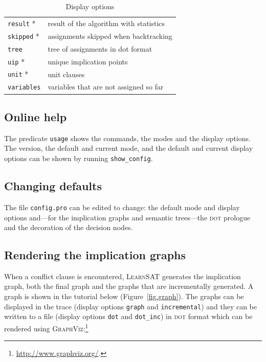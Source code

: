 \documentclass[11pt]{report}
\newcommand*{\p}[1]{\textup{\texttt{#1}}}
\newcommand*{\ls}{\textsc{LearnSAT}}
\newcommand*{\dt}{\textsc{dot}}
\begin{document}
\begin{table}[tbp]
\begin{center}
\begin{tabular}{|l|l|}
\p{result} *   &  result of the algorithm with statistics    \\
\p{skipped} *  &  assignments skipped when backtracking      \\
\p{tree}       &  tree of assignments in dot format\\
\p{uip} *       &  unique implication points                  \\
\p{unit} *     &  unit clauses                               \\
\p{variables} &  variables that are not assigned so far     \\
\hline
\end{tabular}
\end{center}
\caption{Display options}\label{tab.display}
\end{table}

\subsection{Online help}

The predicate \p{usage} shows the commands, the modes and the display
options. The version, the default and current mode, and the default and
current display options can be shown by running \p{show\_config}.

\subsection{Changing defaults}

The file \p{config.pro} can be edited to change: the default mode and
display options and---for the implication graphs and semantic
trees---the \dt{} prologue and the decoration of the decision nodes.


\subsection{Rendering the implication graphs}\label{s.impl}

When a conflict clause is encountered, \ls{} generates the implication
graph, both the final graph and the graphs that are incrementally
generated. A graph is shown in the tutorial below
(Figure~\ref{fig.graph}). The graphs can be displayed in the trace
(display options \p{graph} and \p{incremental}) and they can be written
to a file (display options \p{dot} and \p{dot\_inc}) in \dt{} format
which can be rendered using
\textsc{GraphViz}:\footnote{\url{http://www.graphviz.org/}.}
\end{document}
